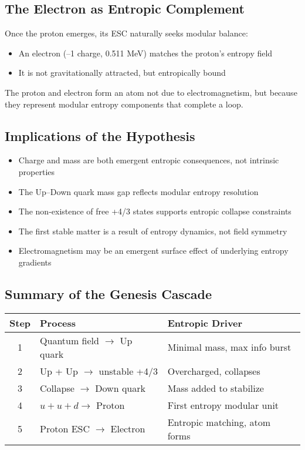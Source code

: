 \documentclass[12pt]{article}
\begin{document}
\subsection{The Electron as Entropic Complement}

Once the proton emerges, its ESC naturally seeks modular balance:
\begin{itemize}
    \item An electron (–1 charge, 0.511 MeV) matches the proton’s entropy field
    \item It is not gravitationally attracted, but entropically bound
\end{itemize}

The proton and electron form an atom not due to electromagnetism, but because they represent modular entropy components that complete a loop.

\subsection{Implications of the Hypothesis}

\begin{itemize}
    \item Charge and mass are both emergent entropic consequences, not intrinsic properties
    \item The Up–Down quark mass gap reflects modular entropy resolution
    \item The non-existence of free +4/3 states supports entropic collapse constraints
    \item The first stable matter is a result of entropy dynamics, not field symmetry
    \item Electromagnetism may be an emergent surface effect of underlying entropy gradients
\end{itemize}

\subsection*{\textbf{Summary of the Genesis Cascade}}

\vspace{0.5em}
\begin{center}
\begin{tabular}{|c|p{6.5cm}|p{6.5cm}|}
\hline
\textbf{Step} & \textbf{Process} & \textbf{Entropic Driver} \\
\hline
1 & Quantum field $\rightarrow$ Up quark & Minimal mass, max info burst \\
\hline
2 & Up + Up $\rightarrow$ unstable +4/3 & Overcharged, collapses \\
\hline
3 & Collapse $\rightarrow$ Down quark & Mass added to stabilize \\
\hline
4 & $u + u + d \rightarrow$ Proton & First entropy modular unit \\
\hline
5 & Proton ESC $\rightarrow$ Electron & Entropic matching, atom forms \\
\hline
\end{tabular}
\end{center}
\end{document}
